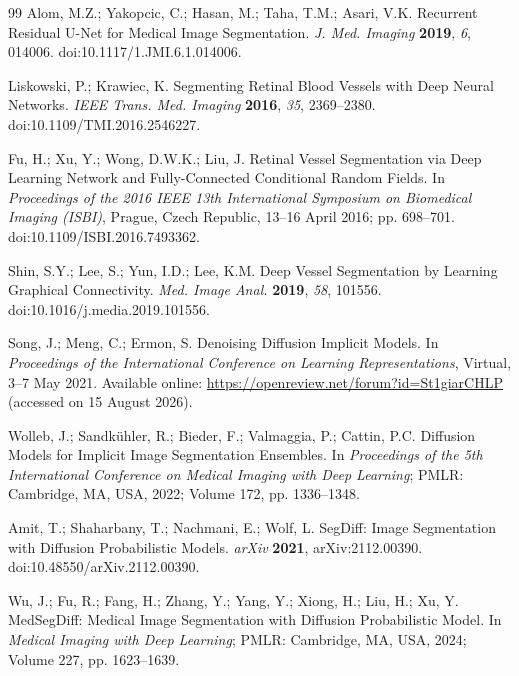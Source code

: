 \documentclass[jimaging,article,submit,pdftex,moreauthors]
  {Definitions/mdpi}
\providecommand{\href}[2]{#2}
\begin{document}
\begin{thebibliography}{99}
Alom, M.Z.; Yakopcic, C.; Hasan, M.; Taha, T.M.; Asari, V.K. Recurrent Residual U-Net for Medical Image Segmentation. \textit{J. Med. Imaging} \textbf{2019}, \textit{6}, 014006. \href{https://doi.org/10.1117/1.JMI.6.1.014006}{doi:10.1117/1.JMI.6.1.014006}.

Liskowski, P.; Krawiec, K. Segmenting Retinal Blood Vessels with Deep Neural Networks. \textit{IEEE Trans. Med. Imaging} \textbf{2016}, \textit{35}, 2369--2380. \href{https://doi.org/10.1109/TMI.2016.2546227}{doi:10.1109/TMI.2016.2546227}.

Fu, H.; Xu, Y.; Wong, D.W.K.; Liu, J. Retinal Vessel Segmentation via Deep Learning Network and Fully-Connected Conditional Random Fields. In \textit{Proceedings of the 2016 IEEE 13th International Symposium on Biomedical Imaging (ISBI)}, Prague, Czech Republic, 13--16 April 2016; pp. 698--701. \href{https://doi.org/10.1109/ISBI.2016.7493362}{doi:10.1109/ISBI.2016.7493362}.

Shin, S.Y.; Lee, S.; Yun, I.D.; Lee, K.M. Deep Vessel Segmentation by Learning Graphical Connectivity. \textit{Med. Image Anal.} \textbf{2019}, \textit{58}, 101556. \href{https://doi.org/10.1016/j.media.2019.101556}{doi:10.1016/j.media.2019.101556}.

Song, J.; Meng, C.; Ermon, S. Denoising Diffusion Implicit Models. In \textit{Proceedings of the International Conference on Learning Representations}, Virtual, 3--7 May 2021. Available online: \url{https://openreview.net/forum?id=St1giarCHLP} (accessed on 15 August 2026).

Wolleb, J.; Sandk\"uhler, R.; Bieder, F.; Valmaggia, P.; Cattin, P.C. Diffusion Models for Implicit Image Segmentation Ensembles. In \textit{Proceedings of the 5th International Conference on Medical Imaging with Deep Learning}; PMLR: Cambridge, MA, USA, 2022; Volume 172, pp. 1336--1348.

Amit, T.; Shaharbany, T.; Nachmani, E.; Wolf, L. SegDiff: Image Segmentation with Diffusion Probabilistic Models. \textit{arXiv} \textbf{2021}, arXiv:2112.00390. \href{https://doi.org/10.48550/arXiv.2112.00390}{doi:10.48550/arXiv.2112.00390}.

Wu, J.; Fu, R.; Fang, H.; Zhang, Y.; Yang, Y.; Xiong, H.; Liu, H.; Xu, Y. MedSegDiff: Medical Image Segmentation with Diffusion Probabilistic Model. In \textit{Medical Imaging with Deep Learning}; PMLR: Cambridge, MA, USA, 2024; Volume 227, pp. 1623--1639.


\end{thebibliography}
\end{document}
